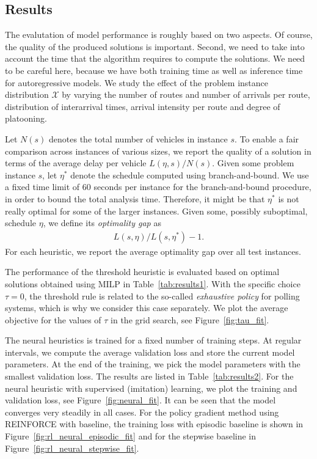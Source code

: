 \documentclass[a4paper]{article}
\theoremstyle{definition}
\theoremstyle{plain}
\begin{document}
\subsection{Results}

The evalutation of model performance is roughly based on two aspects. Of course,
the quality of the produced solutions is important. Second, we need to take into
account the time that the algorithm requires to compute the solutions. We need
to be careful here, because we have both training time as well as inference
time for autoregressive models.
%
We study the effect of the problem instance distribution $\mathcal{X}$ by
varying the number of routes and number of arrivals per route, distribution of
interarrival times, arrival intensity per route and degree of platooning.

Let $N(s)$ denotes the total number of vehicles in instance $s$. To enable a
fair comparison across instances of various sizes, we report the quality of a
solution in terms of the average delay per vehicle $L(\eta, s) / N(s)$.
%
Given some problem instance $s$, let $\eta^{*}$ denote the schedule computed using
branch-and-bound. We use a fixed time limit of 60 seconds per instance for the
branch-and-bound procedure, in order to bound the total analysis time.
Therefore, it might be that $\eta^{*}$ is not really optimal for some of the larger
instances. Given some, possibly suboptimal, schedule $\eta$, we define its \textit{optimality gap}
as
\begin{align*}
  L(s, \eta) / L(s, \eta^{*}) - 1 .
\end{align*}
For each heuristic, we report the average optimality gap over all test
instances.

The performance of the threshold heuristic is evaluated based on optimal
solutions obtained using MILP in Table~\ref{tab:results1}.
%
With the specific choice $\tau = 0$, the threshold rule is related to the
so-called \textit{exhaustive policy} for polling systems, which is why we
consider this case separately. We plot the average objective for the values of
$\tau$ in the grid search, see Figure~\ref{fig:tau_fit}.

The neural heuristics is trained for a fixed number of training steps. At
regular intervals, we compute the average validation loss and store the current
model parameters. At the end of the training, we pick the model parameters with
the smallest validation loss. The results are listed in Table~\ref{tab:results2}.
%
For the neural heuristic with supervised (imitation) learning, we plot the
training and validation loss, see Figure~\ref{fig:neural_fit}. It can be seen that the model
converges very steadily in all cases.
%
For the policy gradient method using REINFORCE with baseline, the training loss
with episodic baseline is shown in Figure~\ref{fig:rl_neural_episodic_fit} and
for the stepwise baseline in Figure~\ref{fig:rl_neural_stepwise_fit}.
\end{document}
